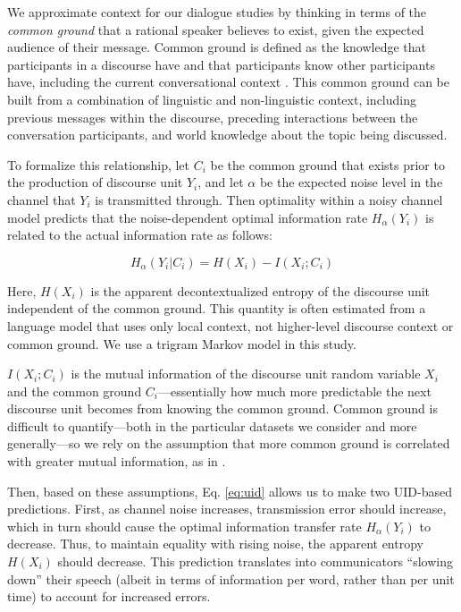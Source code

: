\documentclass[11pt,letterpaper]{article}
\begin{document}
We approximate context for our dialogue studies by thinking in terms of the {\it common ground} that a rational speaker believes to exist, given the expected audience of their message. Common ground is defined as the knowledge that participants in a discourse have and that participants know other participants have, including the current conversational context \cite{clark1996}. This common ground can be built from a combination of linguistic and non-linguistic context, including previous messages within the discourse, preceding interactions between the conversation participants, and world knowledge about the topic being discussed.

To formalize this relationship, let $C_i$ be the common ground that exists prior to the production of discourse unit $Y_i$, and let $\alpha$ be the expected noise level in the channel that $Y_i$ is transmitted through.  Then optimality within a noisy channel model predicts that the noise-dependent optimal information rate $H_{\alpha}(Y_i)$ is related to the actual information rate as follows:

\begin{equation}
H_{\alpha}(Y_i|C_i) =  H(X_i) - I(X_i ; C_i) \label{eq:uid}
\end{equation}

Here, $H(X_i)$ is the apparent decontextualized entropy of the discourse unit independent of the common ground.  This quantity is often estimated from a language model that uses only local context, not higher-level discourse context or common ground.  We use a trigram Markov model in this study.

$I(X_i;C_i)$ is the mutual information of the discourse unit random variable $X_i$ and the common ground $C_i$---essentially how much more predictable the next discourse unit becomes from knowing the common ground.  Common ground is difficult to quantify---both in the particular datasets we consider and more generally---so we rely on the assumption that more common ground is correlated with greater mutual information, as in .

Then, based on these assumptions, Eq. \ref{eq:uid} allows us to make two UID-based predictions. First, as channel noise increases, transmission error should increase, which in turn should cause the optimal information transfer rate $H_\alpha(Y_i)$ to decrease.  Thus, to maintain equality with rising noise, the apparent entropy $H(X_i)$ should decrease. This prediction translates into communicators ``slowing down'' their speech (albeit in terms of information per word, rather than per unit time) to account for increased errors. 
\end{document}
